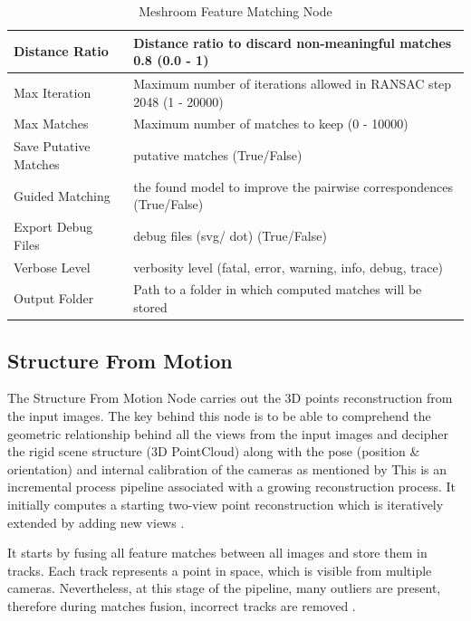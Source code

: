 \documentclass[12pt]{report}
\begin{document}
\begin{table}[H]
{\begin{tabular}{|l|l|}
        Distance Ratio &
          Distance ratio to discard non-meaningful matches 0.8 (0.0 - 1) \\ \hline
        Max Iteration &
          Maximum number of iterations allowed in RANSAC step 2048 (1 - 20000) \\ \hline
        Max Matches &
          Maximum number of matches to keep (0 - 10000) \\ \hline
        Save Putative Matches &
          putative matches (True/False) \\ \hline
        Guided Matching &
          the found model to improve the pairwise correspondences (True/False) \\ \hline
        Export Debug Files &
          debug files (svg/ dot) (True/False) \\ \hline
        Verbose Level &
          verbosity level (fatal, error, warning, info, debug, trace) \\ \hline
        Output Folder &
          Path to a folder in which computed matches will be stored \\ \hline
        \end{tabular}%
        }
        \caption{Meshroom Feature Matching Node}
        \label{tab:FeatureMatching}
        \end{table}
      
      
\subsection{Structure From Motion}

The Structure From Motion Node carries out the 3D points reconstruction from the input images. The key behind this node is to be able to comprehend
the geometric relationship behind all the views from the input images and decipher the rigid scene structure (3D PointCloud) along with the pose (position \& orientation) and internal calibration of the cameras as mentioned by 
This is an incremental process pipeline associated with a growing reconstruction process. It initially computes a starting two-view point reconstruction which is iteratively extended by adding new views .

It starts by fusing all feature matches between all images and store them in tracks. Each track represents a point in space, which is visible from multiple cameras. 
Nevertheless, at this stage of the pipeline, many outliers are present, therefore during matches fusion, incorrect tracks are removed \citep*{Fischler1981RandomSC}.
\end{document}
